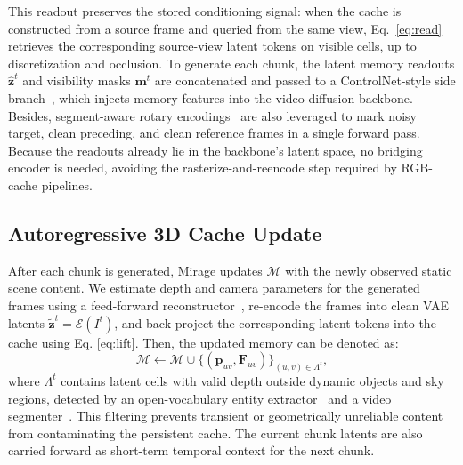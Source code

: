 \documentclass{llmxive}
\providecommand{\method}{Mirage\xspace}
\begin{document}
This readout preserves the stored conditioning signal: when the cache is
constructed from a source frame and queried from the same view,
Eq.~\ref{eq:read} retrieves the corresponding source-view latent tokens on
visible cells, up to discretization and occlusion. 
To generate each chunk, the latent memory readouts $\hat{\mathbf{z}}^t$ and visibility masks $\mathbf{m}^t$ are concatenated and passed to a ControlNet-style side branch~\cite{zhang2023adding}, which injects memory features into the video diffusion backbone. 
Besides, segment-aware rotary encodings~\cite{su2024roformer} are also leveraged to mark noisy target, clean preceding, and clean reference frames in a single forward pass. 
Because the readouts already lie in the backbone's latent space, no bridging encoder is needed, avoiding the rasterize-and-reencode step required by RGB-cache pipelines.




\subsection{Autoregressive 3D Cache Update}
\label{sec:method:update}

After each chunk is generated, \method{} updates $\mathcal{M}$ with the
newly observed static scene content. 
We estimate depth and camera parameters for the generated frames using a
feed-forward reconstructor~\cite{lin2025depth}, re-encode the frames into
clean VAE latents $\tilde{\mathbf{z}}^t=\mathcal{E}(I^t)$, and
back-project the corresponding latent tokens into the cache using Eq. \ref{eq:lift}. Then, the updated memory can be denoted as:
\begin{equation}
\mathcal{M}
\leftarrow
\mathcal{M}
\cup
\bigl\{(\mathbf{p}_{uv}, \mathbf{F}_{uv})\bigr\}_{(u,v)\in\Lambda^t},
\label{eq:lat-update}
\end{equation}
where $\Lambda^t$ contains latent cells with valid depth outside dynamic
objects and sky regions, detected by an open-vocabulary entity
extractor~\cite{yang2025qwen3} and a video segmenter~\cite{carion2025sam3segmentconcepts}.
This filtering prevents transient or geometrically unreliable content
from contaminating the persistent cache. 
The current chunk latents are also carried forward as short-term temporal
context for the next chunk.
\end{document}
